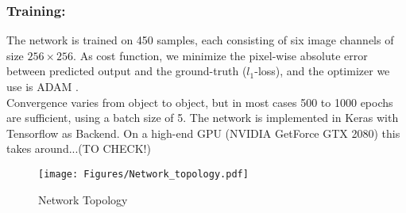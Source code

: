 \subsubsection*{Training: \\} 
The network is trained on 450 samples, each consisting of six image channels of size $256 \times 256$. As cost function, we minimize the pixel-wise absolute error between predicted output and the ground-truth ($l_1$-loss), and the optimizer we use is ADAM \cite{ADAM}. 
\\
Convergence varies from object to object, but in most cases 500 to 1000 epochs are sufficient, using a batch size of 5. The network is implemented in Keras \cite{Keras} with Tensorflow as Backend. On a high-end GPU (NVIDIA GetForce GTX 2080) this takes around...(TO CHECK!)
\begin{figure*}[t]
  \centering
    \texttt{[image: Figures/Network\_topology.pdf]}
     \caption{Network Topology}
     \label{Fig: NetworkTopology}
\end{figure*}

  


